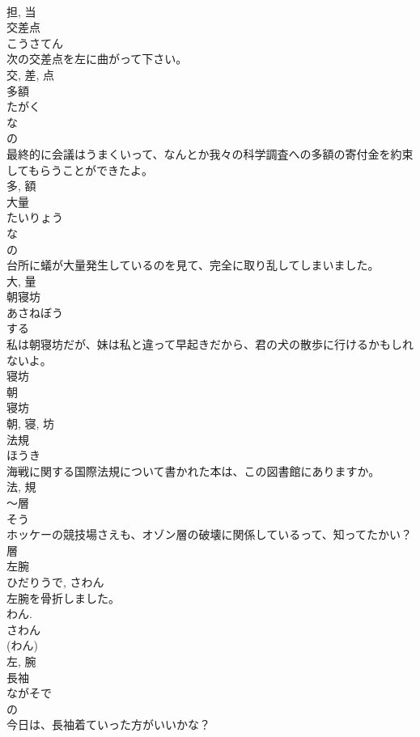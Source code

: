 \documentclass[8pt]{extreport}
\begin{document}
\begin{CJK}{UTF8}{min}
\\	担, 当	
\\	交差点	
\\	こうさてん	
\\	次の交差点を左に曲がって下さい。	
\\	交, 差, 点	
\\	多額	
\\	たがく	
\\	な 
\\	の 
\\	最終的に会議はうまくいって、なんとか我々の科学調査への多額の寄付金を約束してもらうことができたよ。	
\\	多, 額	
\\	大量	
\\	たいりょう	
\\	な 
\\	の 
\\	台所に蟻が大量発生しているのを見て、完全に取り乱してしまいました。	
\\	大, 量	
\\	朝寝坊	
\\	あさねぼう	
\\	する 
\\	私は朝寝坊だが、妹は私と違って早起きだから、君の犬の散歩に行けるかもしれないよ。	
\\	寝坊 
\\	朝 
\\	寝坊 
\\	朝, 寝, 坊	
\\	法規	
\\	ほうき	
\\	海戦に関する国際法規について書かれた本は、この図書館にありますか。	
\\	法, 規	
\\	〜層	
\\	そう	
\\	ホッケーの競技場さえも、オゾン層の破壊に関係しているって、知ってたかい？	
\\	層	
\\	左腕	
\\	ひだりうで, さわん	
\\	左腕を骨折しました。	
\\	わん. 
\\	さわん 
\\	(わん) 
\\	左, 腕	
\\	長袖	
\\	ながそで	
\\	の 
\\	今日は、長袖着ていった方がいいかな？	

\end{CJK}
\end{document}

